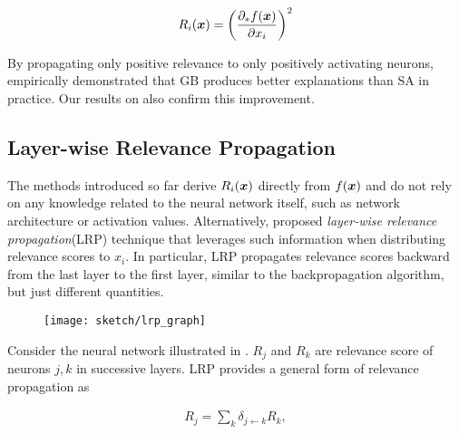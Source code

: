 \begin{align*}
	R_i(\x) = \bigg( \frac{ \partial_* f(\patvector{x}) }{ \partial x_i }  \bigg)^2
\end{align*}

By propagating only positive relevance to only positively activating neurons, \citet{SpringenbergStrivingSimplicityAll2015a} empirically demonstrated that GB produces better explanations than SA in practice. Our results on \addfigure{\ref{fig:lenet_heatmaps}} also confirm this improvement.
%

\subsection{Layer-wise Relevance Propagation}
The methods introduced so far derive $R_i(\boldsymbol{x})$ directly from $f(\patvector{x})$ and do not rely on any knowledge related to the neural network itself, such as network architecture or activation values. Alternatively, \citet{BachPixelWiseExplanationsNonLinear2015} proposed \textit{layer-wise relevance propagation}(LRP) technique that leverages such information when distributing relevance scores to $x_i$. In particular, LRP propagates relevance scores backward from the last layer to the first layer, similar to the backpropagation algorithm, but just different quantities.




 \begin{figure}
	\begin{center}
		\texttt{[image: sketch/lrp\_graph]}
		\label{fig:lrp_graph}
	\end{center}
\end{figure}

Consider the neural network illustrated in \addfigure{\ref{fig:lrp_graph}}. $R_j$ and $R_k$ are relevance score of  neurons $j,k$ in successive layers.  LRP provides a general form of relevance propagation as 

\begin{align} \label{eq:general_lrp_rj}
	R_j = \sum_{k} 	\delta_{j\leftarrow k} R_{k} ,
\end{align}

